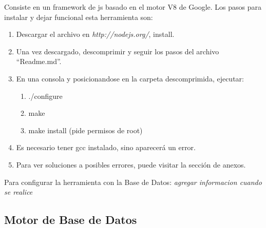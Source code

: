 Consiste en un framework de js basado en el motor V8 de Google. Los pasos para instalar y dejar funcional esta herramienta son:

\begin{enumerate}
 \item Descargar el archivo en \textit{http://nodejs.org/}, install.
 \item Una vez descargado, descomprimir y seguir los pasos del archivo ``Readme.md''.
 \item En una consola y posicionandose en la carpeta descomprimida, ejecutar:
 \begin{enumerate}
  \item ./configure
  \item make
  \item make install (pide permisos de root)
 \end{enumerate}
 \item Es necesario tener gcc instalado, sino aparecerá un error.
 \item Para ver soluciones a posibles errores, puede visitar la sección de anexos.
\end{enumerate}

Para configurar la herramienta con la Base de Datos:
\textit{agregar informacion cuando se realice}

\subsection{Motor de Base de Datos}
 
